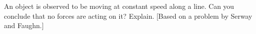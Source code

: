         An object is observed to be moving at constant speed
        along a line. Can you conclude that no forces are acting on
        it? Explain. [Based on a problem by Serway and Faughn.]        

